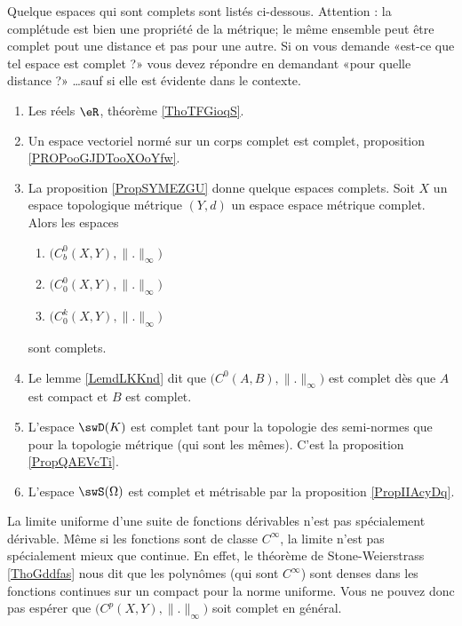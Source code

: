 Quelque espaces qui sont complets sont listés ci-dessous. Attention : la complétude est bien une propriété de la métrique; le même ensemble peut être complet pout une distance et pas pour une autre. Si on vous demande «est-ce que tel espace est complet ?» vous devez répondre en demandant «pour quelle distance ?» \ldots sauf si elle est évidente dans le contexte.
\begin{multicols}{2}
    \begin{enumerate}
        \item
            Les réels \( \eR\), théorème \ref{ThoTFGioqS}. 
        \item
            Un espace vectoriel normé sur un corps complet est complet, proposition \ref{PROPooGJDTooXOoYfw}.
        \item
            La proposition \ref{PropSYMEZGU} donne quelque espaces complets. Soit \( X\) un espace topologique métrique \( (Y,d)\) un espace espace métrique complet. Alors les espaces
    \begin{enumerate}
        \item
            \( \big( C^0_b(X,Y),\| . \|_{\infty} \big)\) 
        \item
            \( \big( C^0_0(X,Y),\| . \|_{\infty} \big)\)
        \item
            \( \big( C^k_0(X,Y),\| . \|_{\infty} \big)\)
    \end{enumerate} 
    sont complets.
\item
    Le lemme \ref{LemdLKKnd} dit que \( \big( C^0(A,B),\| . \|_{\infty}\big)\) est complet dès que \( A\) est compact et \( B\) est complet.

\item
    L'espace \( \swD(K)\) est complet tant pour la topologie des semi-normes que pour la topologie métrique (qui sont les mêmes). C'est la proposition \ref{PropQAEVcTi}.
\item
    L'espace \( \swS(\Omega)\) est complet et métrisable par la proposition \ref{PropIIAcyDq}.
    \end{enumerate}
\end{multicols}

    La limite uniforme d'une suite de fonctions dérivables n'est pas spécialement dérivable. Même si les fonctions sont de classe \(  C^{\infty}\), la limite n'est pas spécialement mieux que continue. En effet, le théorème de Stone-Weierstrass \ref{ThoGddfas} nous dit que les polynômes (qui sont \(  C^{\infty}\)) sont denses dans les fonctions continues sur un compact pour la norme uniforme. Vous ne pouvez donc pas espérer que \( \big( C^p(X,Y),\| . \|_{\infty} \big)\) soit complet en général.

